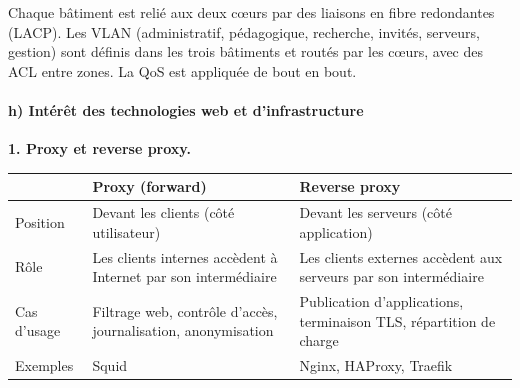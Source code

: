 \documentclass[12pt,a4paper]{article}
\begin{document}
\begin{center}
\end{center}

Chaque bâtiment est relié aux deux cœurs par des liaisons en fibre
redondantes (LACP). Les VLAN (administratif, pédagogique, recherche,
invités, serveurs, gestion) sont définis dans les trois bâtiments et
routés par les cœurs, avec des ACL entre zones. La QoS est appliquée de
bout en bout.

\paragraph{h) Intérêt des technologies web et d'infrastructure}

\textbf{1. Proxy et reverse proxy.}

\begin{longtable}{|L{2.6cm}|L{6cm}|L{6cm}|}
\hline
 & \textbf{Proxy (forward)} & \textbf{Reverse proxy} \\ \hline
Position & Devant les clients (côté utilisateur) & Devant les serveurs
(côté application) \\ \hline
Rôle & Les clients internes accèdent à Internet par son intermédiaire &
Les clients externes accèdent aux serveurs par son intermédiaire \\ \hline
Cas d'usage & Filtrage web, contrôle d'accès, journalisation,
anonymisation & Publication d'applications, terminaison TLS, répartition
de charge \\ \hline
Exemples & Squid & Nginx, HAProxy, Traefik \\ \hline
\end{longtable}
\end{document}
